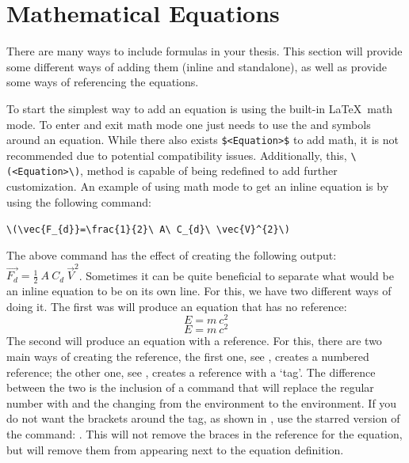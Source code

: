 \chapter{Mathematical Equations}\label{ch:mathematicalequations}
	There are many ways to include formulas in your thesis. 
	This section will provide some different ways of adding them (inline and standalone), as well as provide some ways of referencing the equations.

	To start the simplest way to add an equation is using the built-in \LaTeX\ math mode. 
	To enter and exit math mode one just needs to use the \cmd{(} and \cmd{)} symbols around an equation. 
	While there also exists \lstinline[basicstyle=\ttfamily]|$<Equation>$| to add math, it is not recommended due to potential compatibility issues. 
	Additionally, this, \lstinline[basicstyle=\ttfamily]|\(<Equation>\)|, method is capable of being redefined to add further customization. 
	An example of using math mode to get an inline equation is by using the following command:
	\begin{center}
		\lstinline[basicstyle=\ttfamily]|\(\vec{F_{d}}=\frac{1}{2}\ A\ C_{d}\ \vec{V}^{2}\)|
	\end{center}
	The above command has the effect of creating the following output: \(\vec{F_{d}}=\frac{1}{2}\ A\ C_{d}\ \vec{V}^{2}\).
	Sometimes it can be quite beneficial to separate what would be an inline equation to be on its own line. 
	For this, we have two different ways of doing it. 
	The first was will produce an equation that has no reference:
	\[
		E = m\ c^2
	\] %
	\begin{equation*}
		E = m\ c^2
	\end{equation*}
	The second will produce an equation with a reference. 
	For this, there are two main ways of creating the reference, the first one, see , creates a numbered reference; the other one, see , creates a reference with a `tag'. 
	The difference between the two is the inclusion of a  command that will replace the regular number with  and the changing from the  environment to the  environment.
	If you do not want the brackets around the tag, as shown in , use the starred version of the command: . 
	This will not remove the braces in the reference for the equation, but will remove them from appearing next to the equation definition.


